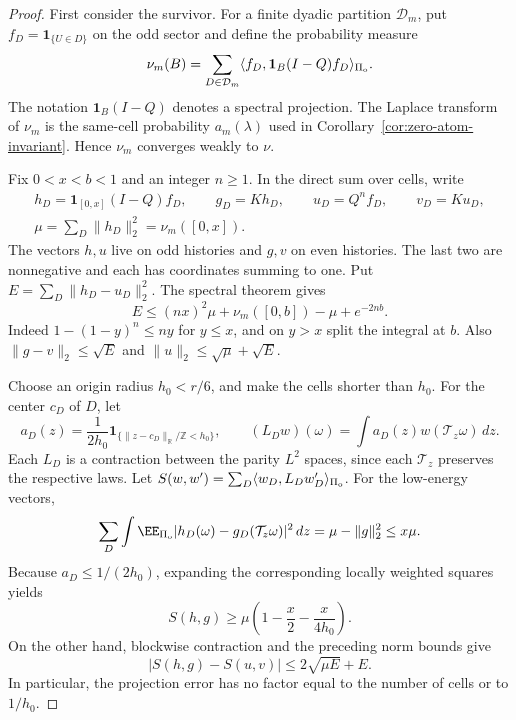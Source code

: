 \documentclass[11pt,letterpaper]{article}
\newcommand{\T}{\mathbb R/\mathbb Z}\newcommand{\Leb}{\operatorname{Leb}}
\newcommand{\ind}{\mathbf 1}\newcommand{\Exp}{\operatorname{Exp}}
\begin{document}
\begin{proof}
First consider the survivor. For a finite dyadic partition
$\mathcal D_m$, put $f_D=\ind_{\{U\in D\}}$ on the odd sector and
define the probability measure
\[
 \nu_m(B)=\sum_{D\in\mathcal D_m}
   \langle f_D,\ind_B(I-Q)f_D\rangle_{\Pi_{\rm o}}.
\]
The notation $\ind_B(I-Q)$ denotes a spectral projection.
The Laplace transform of $\nu_m$ is the same-cell probability
$a_m(\lambda)$ used in Corollary~\ref{cor:zero-atom-invariant}.
Hence $\nu_m$ converges weakly to $\nu$.

Fix $0<x<b<1$ and an integer $n\ge1$. In the direct sum over cells,
write
\begin{gather*}
 h_D=\ind_{[0,x]}(I-Q)f_D,\qquad g_D=Kh_D,
 \qquad u_D=Q^n f_D,\qquad v_D=Ku_D,\\
 \mu=\sum_D\|h_D\|_2^2=\nu_m([0,x]).
\end{gather*}
The vectors $h,u$ live on odd histories and $g,v$ on even histories.
The last two are nonnegative and each has coordinates summing to one.
Put $E=\sum_D\|h_D-u_D\|_2^2$. The spectral theorem gives
\begin{equation}\label{eq:spectral-window-error}
 E\le (nx)^2\mu+\nu_m([0,b])-\mu+e^{-2nb}.
\end{equation}
Indeed $1-(1-y)^n\le ny$ for $y\le x$, and on $y>x$ split the
integral at $b$. Also $\|g-v\|_2\le\sqrt E$ and
$\|u\|_2\le\sqrt\mu+\sqrt E$.

Choose an origin radius $h_0<r/6$, and make the cells shorter than
$h_0$. For the center $c_D$ of $D$, let
\[
 a_D(z)=\frac1{2h_0}\ind_{\{\|z-c_D\|_\T<h_0\}},
 \qquad
 (L_D w)(\omega)=\int a_D(z)w(\mathcal T_z\omega)\,dz.
\]
Each $L_D$ is a contraction between the parity $L^2$ spaces, since
each $\mathcal T_z$ preserves the respective laws. Let
$S(w,w')=\sum_D\langle w_D,L_Dw'_D\rangle_{\Pi_{\rm o}}$.
For the low-energy vectors,
\[
 \sum_D\int\EE_{\Pi_{\rm o}}
       |h_D(\omega)-g_D(\mathcal T_z\omega)|^2\,dz
   =\mu-\|g\|_2^2\le x\mu.
\]
Because $a_D\le1/(2h_0)$, expanding the corresponding locally
weighted squares yields
\begin{equation}\label{eq:local-low-energy}
 S(h,g)\ge\mu\left(1-\frac x2-\frac{x}{4h_0}\right).
\end{equation}
On the other hand, blockwise contraction and the preceding norm bounds
give
\begin{equation}\label{eq:local-projection-error}
 |S(h,g)-S(u,v)|\le2\sqrt{\mu E}+E.
\end{equation}
In particular, the projection error has no factor equal to the
number of cells or to $1/h_0$.


\end{proof}
\end{document}
